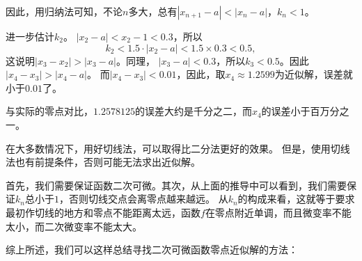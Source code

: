 \documentclass[12pt,UTF8,fontset=none]{ctexbook}
\begin{document}
因此，用归纳法可知，不论$n$多大，总有$|x_{n+1} - a| < |x_n - a|$，$k_n < 1$。

进一步估计$k_2$。
$|x_2 - a| < x_2 - 1 < 0.3$，所以
$$ k_2 < 1.5 \cdot |x_2 - a| < 1.5 \times 0.3 < 0.5, $$
这说明$|x_3 - x_2| > |x_3 - a|$。同理，
$|x_3 - a| < 0.3$，所以$k_3 < 0.5$。因此$|x_4 - x_3| > |x_4 - a|$。
而$|x_4 - x_3| < 0.01$，因此，取$x_4 \approx 1.2599$为近似解，误差就小于$0.01$了。

与实际的零点对比，$1.2578125$的误差大约是千分之二，而$x_4$的误差小于百万分之一。

在大多数情况下，用好切线法，可以取得比二分法更好的效果。
但是，使用切线法也有前提条件，否则可能无法求出近似解。

首先，我们需要保证函数二次可微。其次，从上面的推导中可以看到，我们需要保证$k_n$总小于$1$，否则切线交点会离零点越来越远。
从$k_n$的构成来看，这就等于要求最初作切线的地方和零点不能距离太远，函数$f$在零点附近单调，而且微变率不能太小，而二次微变率不能太大。

综上所述，我们可以这样总结寻找二次可微函数零点近似解的方法：

\begin{center}
\end{center}
\end{document}
